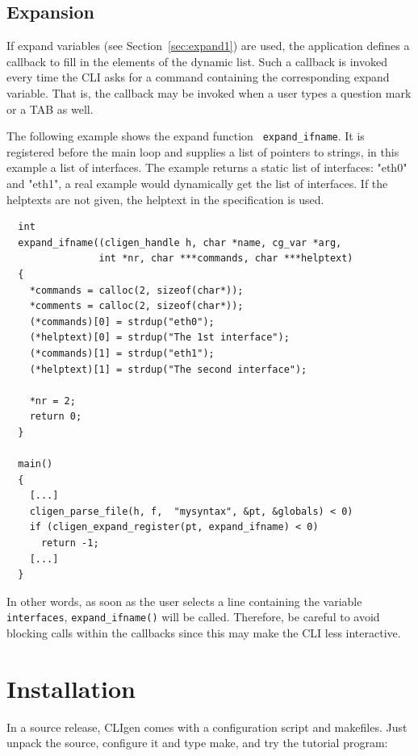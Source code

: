 \documentclass[a4paper, 10pt] {article}
\begin{document}
\subsection{Expansion}
\label{sec:expand}

If expand variables (see Section~\ref{sec:expand1}) are used, the
application defines a callback to fill in the elements of the dynamic
list. Such a callback is invoked every time the CLI asks for a command
containing the corresponding expand variable. That is, the callback
may be invoked when a user types a question mark or a TAB as well.

The following example shows the expand function {\tt
  expand\_ifname}. It is registered before the main loop and supplies
a list of pointers to strings, in this example a list of
interfaces. The example returns a static list of interfaces: "eth0"
and "eth1", a real example would dynamically get the list of
interfaces. If the helptexts are not given, the helptext in the specification is used.


\begin{verbatim}
  int 
  expand_ifname((cligen_handle h, char *name, cg_var *arg, 
                int *nr, char ***commands, char ***helptext)
  {
    *commands = calloc(2, sizeof(char*)); 
    *comments = calloc(2, sizeof(char*)); 
    (*commands)[0] = strdup("eth0");
    (*helptext)[0] = strdup("The 1st interface");
    (*commands)[1] = strdup("eth1");
    (*helptext)[1] = strdup("The second interface");

    *nr = 2;
    return 0;
  }

  main()
  {   
    [...]
    cligen_parse_file(h, f,  "mysyntax", &pt, &globals) < 0)
    if (cligen_expand_register(pt, expand_ifname) < 0)
      return -1;
    [...]
  }
\end{verbatim}

In other words, as soon as the user selects a line containing the
variable {\tt interfaces}, {\tt expand\_ifname()} will be
called. Therefore, be careful to avoid blocking calls within the
callbacks since this may make the CLI less interactive.

\section{Installation}

In a source release, CLIgen comes with a configuration script and
makefiles. Just unpack the source, configure it and type make, and try
the tutorial program:
\end{document}
